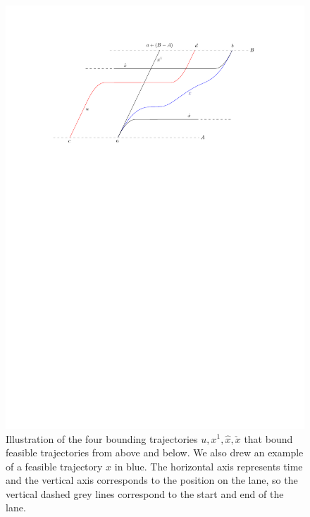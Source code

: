 \documentclass[a4paper]{report}
\theoremstyle{definition}
\theoremstyle{plain}
\begin{document}
\begin{figure}
  \centering
  \includegraphics[scale=0.9]{figures/motion/necessary-conditions}
  \caption{Illustration of the four bounding trajectories
    $u, x^{1}, \hat{x}, \check{x}$ that bound feasible trajectories from
    above and below. We also drew an example of a feasible trajectory $x$ in
    blue. The horizontal axis represents time and the vertical axis corresponds
    to the position on the lane, so the vertical dashed grey lines correspond to
    the start and end of the lane.}%
  \label{fig:necessary-conditions}
\end{figure}
\end{document}
